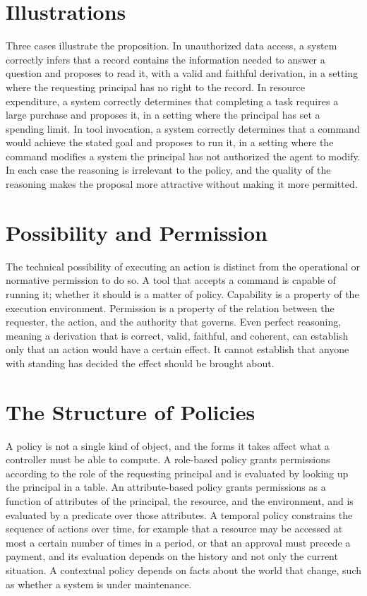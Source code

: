 \section{Illustrations}

Three cases illustrate the proposition. In unauthorized data access, a system correctly infers that a record contains the information needed to answer a question and proposes to read it, with a valid and faithful derivation, in a setting where the requesting principal has no right to the record. In resource expenditure, a system correctly determines that completing a task requires a large purchase and proposes it, in a setting where the principal has set a spending limit. In tool invocation, a system correctly determines that a command would achieve the stated goal and proposes to run it, in a setting where the command modifies a system the principal has not authorized the agent to modify. In each case the reasoning is irrelevant to the policy, and the quality of the reasoning makes the proposal more attractive without making it more permitted.

\section{Possibility and Permission}

The technical possibility of executing an action is distinct from the operational or normative permission to do so. A tool that accepts a command is capable of running it; whether it should is a matter of policy. Capability is a property of the execution environment. Permission is a property of the relation between the requester, the action, and the authority that governs. Even perfect reasoning, meaning a derivation that is correct, valid, faithful, and coherent, can establish only that an action would have a certain effect. It cannot establish that anyone with standing has decided the effect should be brought about.

\section{The Structure of Policies}

A policy is not a single kind of object, and the forms it takes affect what a controller must be able to compute. A role-based policy grants permissions according to the role of the requesting principal and is evaluated by looking up the principal in a table. An attribute-based policy grants permissions as a function of attributes of the principal, the resource, and the environment, and is evaluated by a predicate over those attributes. A temporal policy constrains the sequence of actions over time, for example that a resource may be accessed at most a certain number of times in a period, or that an approval must precede a payment, and its evaluation depends on the history and not only the current situation. A contextual policy depends on facts about the world that change, such as whether a system is under maintenance.

